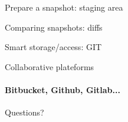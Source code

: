 \documentclass[english]{slides}
\begin{document}
\begin{frame}{Prepare a snapshot: staging area}
\end{frame}

\begin{frame}{Comparing snapshots: diffs}
\end{frame}

\begin{frame}{Smart storage/access: GIT}



\end{frame}

\begin{frame}{Collaborative plateforms }
\framesubtitle{Bitbucket, Github, Gitlab...}
\end{frame}

\begin{frame}
\begin{center}\huge
Questions?
\end{center}
\end{frame}
\end{document}
